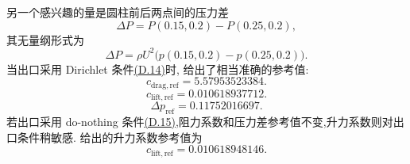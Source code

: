 \begin{example}[二维中 $\mathrm{Re}=20$ 的定常圆柱绕流]
另一个感兴趣的量是圆柱前后两点间的压力差
\[
\Delta P=P(0.15,0.2)-P(0.25,0.2),
\]
其无量纲形式为
\begin{equation}\label{eq:appendix-d-18}
\Delta P=\rho U^2\bigl(p(0.15,0.2)-p(0.25,0.2)\bigr).
\end{equation}
当出口采用 Dirichlet 条件\hyperref[eq:appendix-d-14]{(D.14)}时,\textcite{JohnMatthies2001} 给出了相当准确的参考值:
\begin{equation}\label{eq:appendix-d-19}
c_{\mathrm{drag,ref}}=5.57953523384.
\end{equation}
\begin{equation}\label{eq:appendix-d-20}
c_{\mathrm{lift,ref}}=0.010618937712.
\end{equation}
\begin{equation}\label{eq:appendix-d-21}
\Delta p_{\mathrm{ref}}=0.11752016697.
\end{equation}
若出口采用 do-nothing 条件\hyperref[eq:appendix-d-15]{(D.15)},阻力系数和压力差参考值不变,升力系数则对出口条件稍敏感.\textcite{Nabh1998} 给出的升力系数参考值为
\begin{equation}\label{eq:appendix-d-22}
c_{\mathrm{lift,ref}}=0.010618948146.
\end{equation}
\end{example}

